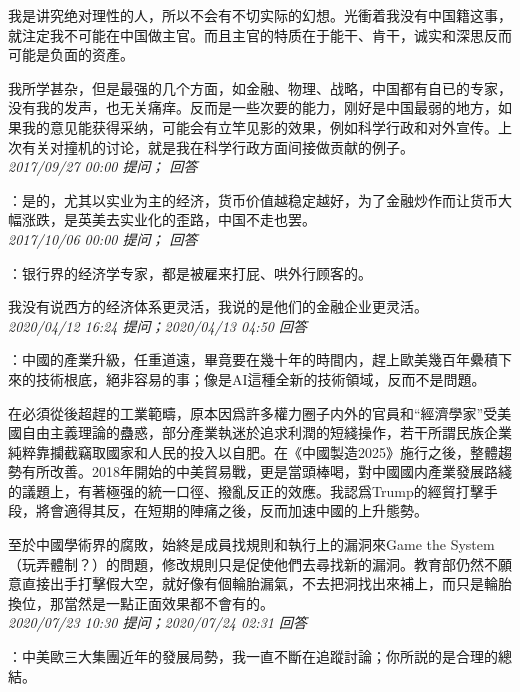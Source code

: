 \documentclass[twocolumn]{ctexart}
\begin{document}
我是讲究绝对理性的人，所以不会有不切实际的幻想。光衝着我没有中国籍这事，就注定我不可能在中国做主官。而且主官的特质在于能干、肯干，诚实和深思反而可能是负面的资產。

我所学甚杂，但是最强的几个方面，如金融、物理、战略，中国都有自已的专家，没有我的发声，也无关痛痒。反而是一些次要的能力，刚好是中国最弱的地方，如果我的意见能获得采纳，可能会有立竿见影的效果，例如科学行政和对外宣传。上次有关对撞机的讨论，就是我在科学行政方面间接做贡献的例子。\\

\textit{\hfill\noindent\small 2017/09/27 00:00 提问； 回答}

：是的，尤其以实业为主的经济，货币价值越稳定越好，为了金融炒作而让货币大幅涨跌，是英美去实业化的歪路，中国不走也罢。\\

\textit{\hfill\noindent\small 2017/10/06 00:00 提问； 回答}

：银行界的经济学专家，都是被雇来打屁、哄外行顾客的。

我没有说西方的经济体系更灵活，我说的是他们的金融企业更灵活。\\

\textit{\hfill\noindent\small 2020/04/12 16:24 提问；2020/04/13 04:50 回答}

：中國的產業升級，任重道遠，畢竟要在幾十年的時間内，趕上歐美幾百年纍積下來的技術根底，絕非容易的事；像是AI這種全新的技術領域，反而不是問題。

在必須從後超趕的工業範疇，原本因爲許多權力圈子内外的官員和“經濟學家”受美國自由主義理論的蠱惑，部分產業執迷於追求利潤的短綫操作，若干所謂民族企業純粹靠攔截竊取國家和人民的投入以自肥。在《中國製造2025》施行之後，整體趨勢有所改善。2018年開始的中美貿易戰，更是當頭棒喝，對中國國内產業發展路綫的議題上，有著極强的統一口徑、撥亂反正的效應。我認爲Trump的經貿打擊手段，將會適得其反，在短期的陣痛之後，反而加速中國的上升態勢。

至於中國學術界的腐敗，始終是成員找規則和執行上的漏洞來Game the System（玩弄體制？）的問題，修改規則只是促使他們去尋找新的漏洞。教育部仍然不願意直接出手打擊假大空，就好像有個輪胎漏氣，不去把洞找出來補上，而只是輪胎換位，那當然是一點正面效果都不會有的。
\\

\textit{\hfill\noindent\small 2020/07/23 10:30 提问；2020/07/24 02:31 回答}

：中美歐三大集團近年的發展局勢，我一直不斷在追蹤討論；你所説的是合理的總結。
\end{document}
